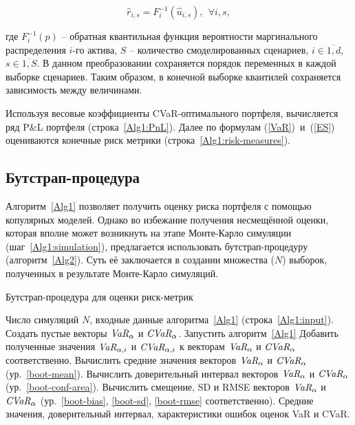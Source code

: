 \begin{equation} \label{pobs-to-qtile}
    \hat{r}_{i,s} = F^{-1}_i (\hat{u}_{i,s}), \ \
    \forall i, s,
\end{equation}

\noindent где $F^{-1}_i (p)$ -- обратная квантильная функция вероятности маргинального распределения $i$-го актива, $S$ -- количество смоделированных сценариев, $i \in \overline{1,d}$, $s \in \overline{1,S}$.
В данном преобразовании сохраняется порядок переменных в каждой выборке сценариев.
Таким образом, в конечной выборке квантилей сохраняется зависимость между величинами.

Используя весовые коэффициенты CVaR-оптимального портфеля, вычисляется ряд P\&L портфеля (строка~\ref{Alg1:PnL}). Далее по формулам (\ref{VaR})~и~(\ref{ES}) оцениваются конечные риск метрики (строка~\ref{Alg1:risk-measures}).

\subsection{Бутстрап-процедура}
\label{methodology:bootstrap}

Алгоритм~\ref{Alg1} позволяет получить оценку риска портфеля с помощью копулярных моделей. 
Однако во избежание получения несмещённой оценки, которая вполне может возникнуть на этапе Монте-Карло симуляции (шаг~\ref{Alg1:simulation}), предлагается использовать бутстрап-процедуру (алгоритм~\ref{Alg2}).
Суть её заключается в создании множества ($N$) выборок, полученных в результате Монте-Карло симуляций.

\begin{algorithm}[t]
\caption{Бутстрап-процедура для оценки риск-метрик}
\label{Alg2}
\begin{algorithmic}[1]
	\Require Число симуляций $N$, входные данные алгоритма~\ref{Alg1} (строка~\ref{Alg1:input}).
	\State Создать пустые векторы $\emph{VaR}_\alpha$ и $\emph{CVaR}_\alpha$.
	\For {$i \in \overline{1,N}$}
	    \State Запустить алгоритм~\ref{Alg1}
	    \State Добавить полученные значения $\emph{VaR}_{\alpha, i}$ и $\emph{CVaR}_{\alpha, i}$ к векторам $\emph{VaR}_\alpha$ и $\emph{CVaR}_\alpha$ соответственно.
	\EndFor
	\State Вычислить средние значения векторов $\emph{VaR}_\alpha$ и $\emph{CVaR}_\alpha$ (ур.~\ref{boot-mean}).
	\State Вычислить доверительный интервал векторов $\emph{VaR}_\alpha$ и $\emph{CVaR}_\alpha$ (ур.~\ref{boot-conf-area}).
	\State Вычислить смещение, SD и RMSE векторов $\emph{VaR}_\alpha$ и $\emph{CVaR}_\alpha$ (ур.~\ref{boot-bias}, \ref{boot-sd}, \ref{boot-rmse} соответственно).
	\Ensure Средние значения, доверительный интервал, характеристики ошибок оценок VaR и CVaR.
\end{algorithmic}
\end{algorithm}

